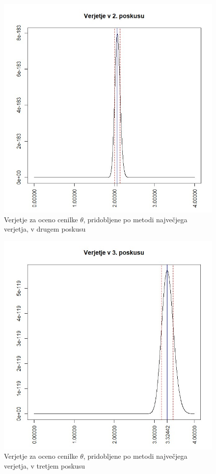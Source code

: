 \documentclass[a4paper, 10pt]{article}
\begin{document}
	\begin{figure}[h!]
		\label{fig: 2Dplot2}
		\centering
		\includegraphics[scale = 0.3]{VerjetjeMNV2}
		\caption{Verjetje za oceno cenilke $\theta$, pridobljene po metodi največjega verjetja, v drugem poskusu}
	\end{figure}

	\begin{figure}[h!]
		\label{fig: 2Dplot3}
		\centering
		\includegraphics[scale = 0.325]{VerjetjeMNV3}
		\caption{Verjetje za oceno cenilke $\theta$, pridobljene po metodi največjega verjetja, v tretjem poskusu}
	\end{figure}
	
\end{document}
